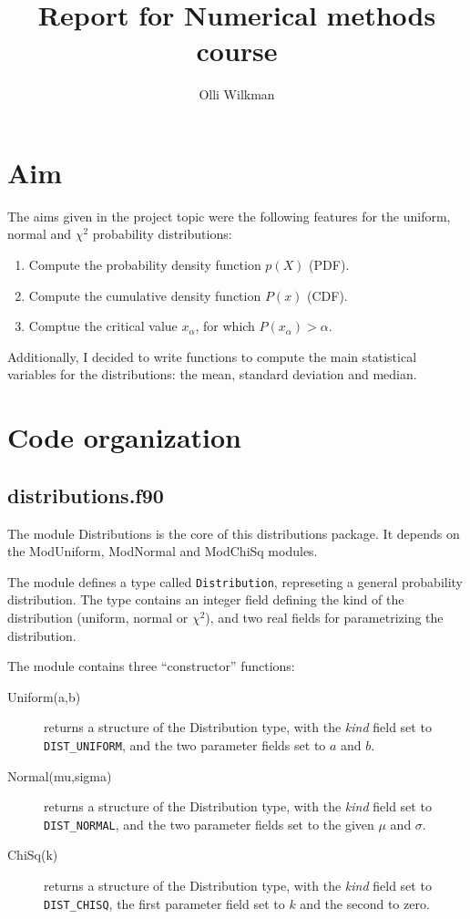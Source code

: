 \documentclass[a4paper]{article}
\title{Report for Numerical methods course}
\author{Olli Wilkman}
\begin{document}
\maketitle

\tableofcontents

\section{Aim}

The aims given in the project topic were the following features for the uniform, normal and $\chi^2$ probability distributions:

\begin{enumerate}
    \item Compute the probability density function $p(X)$ (PDF).
    \item Compute the cumulative density function $P(x)$ (CDF).
    \item Comptue the critical value $x_\alpha$, for which $P(x_\alpha) > \alpha$.
\end{enumerate}

Additionally, I decided to write functions to compute the main statistical variables for the distributions: the mean, standard deviation and median.


\section{Code organization}

\subsection{distributions.f90}

The module Distributions is the core of this distributions package. It depends on the ModUniform, ModNormal and ModChiSq modules.

The module defines a type called \verb+Distribution+, represeting a general probability distribution. The type contains an integer field defining the kind of the distribution (uniform, normal or $\chi^2$), and two real fields for parametrizing the distribution.

The module contains three ``constructor'' functions:

\begin{description}
    \item[Uniform(a,b)] returns a structure of the Distribution type, with the \emph{kind} field set to \verb+DIST_UNIFORM+, and the two parameter fields set to $a$ and $b$.
    \item[Normal(mu,sigma)] returns a structure of the Distribution type, with the \emph{kind} field set to \verb+DIST_NORMAL+, and the two parameter fields set to the given $\mu$ and $\sigma$.
    \item[ChiSq(k)] returns a structure of the Distribution type, with the \emph{kind} field set to \verb+DIST_CHISQ+, the first parameter field set to $k$ and the second to zero.
\end{description}
\end{document}
